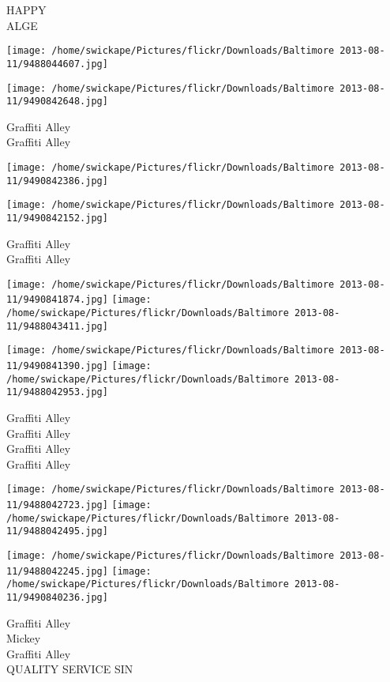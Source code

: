\documentclass[10pt,letterpaper]{article}
\begin{document}
HAPPY\\
ALGE
\pagebreak

\texttt{[image: /home/swickape/Pictures/flickr/Downloads/Baltimore 2013-08-11/9488044607.jpg]}

\vspace{0.25in}
\texttt{[image: /home/swickape/Pictures/flickr/Downloads/Baltimore 2013-08-11/9490842648.jpg]}

Graffiti Alley\\
Graffiti Alley
\pagebreak

\texttt{[image: /home/swickape/Pictures/flickr/Downloads/Baltimore 2013-08-11/9490842386.jpg]}

\vspace{0.25in}
\texttt{[image: /home/swickape/Pictures/flickr/Downloads/Baltimore 2013-08-11/9490842152.jpg]}

Graffiti Alley\\
Graffiti Alley
\pagebreak

\texttt{[image: /home/swickape/Pictures/flickr/Downloads/Baltimore 2013-08-11/9490841874.jpg]}
\texttt{[image: /home/swickape/Pictures/flickr/Downloads/Baltimore 2013-08-11/9488043411.jpg]}

\texttt{[image: /home/swickape/Pictures/flickr/Downloads/Baltimore 2013-08-11/9490841390.jpg]}
\texttt{[image: /home/swickape/Pictures/flickr/Downloads/Baltimore 2013-08-11/9488042953.jpg]}

Graffiti Alley\\
Graffiti Alley\\
Graffiti Alley\\
Graffiti Alley
\pagebreak

\texttt{[image: /home/swickape/Pictures/flickr/Downloads/Baltimore 2013-08-11/9488042723.jpg]}
\texttt{[image: /home/swickape/Pictures/flickr/Downloads/Baltimore 2013-08-11/9488042495.jpg]}

\texttt{[image: /home/swickape/Pictures/flickr/Downloads/Baltimore 2013-08-11/9488042245.jpg]}
\texttt{[image: /home/swickape/Pictures/flickr/Downloads/Baltimore 2013-08-11/9490840236.jpg]}

Graffiti Alley\\
Mickey\\
Graffiti Alley\\
QUALITY SERVICE SIN
\pagebreak
\end{document}
